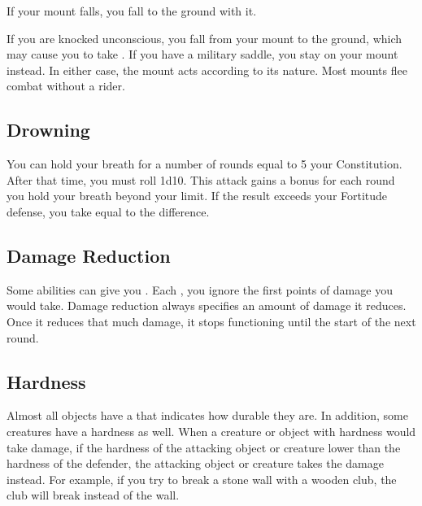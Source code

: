          If your mount falls, you fall to the ground with it.

         If you are knocked unconscious, you fall from your mount to the ground, which may cause you to take .
        If you have a military saddle, you stay on your mount instead.
        In either case, the mount acts according to its nature.
        Most mounts flee combat without a rider.

    \subsection{Drowning}\label{Drowning}
        You can hold your breath for a number of rounds equal to 5 \add your Constitution.
        After that time, you must roll 1d10.
        This attack gains a  bonus for each round you hold your breath beyond your limit.
        If the result exceeds your Fortitude defense, you take  equal to the difference.

    \subsection{Damage Reduction}\label{Damage Reduction}
        Some abilities can give you .
        Each , you ignore the first points of damage you would take.
        Damage reduction always specifies an amount of damage it reduces.
        Once it reduces that much damage, it stops functioning until the start of the next round.

    \subsection{Hardness}\label{Hardness}
        Almost all objects have a  that indicates how durable they are.
        In addition, some creatures have a hardness as well.
        When a creature or object with hardness would take damage, if the hardness of the attacking object or creature lower than the hardness of the defender, the attacking object or creature takes the damage instead.
        For example, if you try to break a stone wall with a wooden club, the club will break instead of the wall.

